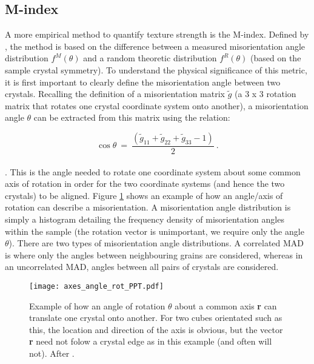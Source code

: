 \documentclass[a4paper,12pt]{report}
\numberwithin{equation}{chapter}
\begin{document}
\subsection{M-index} \label{subsec:Mindex}
A more empirical method to quantify texture strength is the M-index. Defined by \cite{Skemer}, the method is based on the difference between a measured misorientation angle distribution $f^M(\theta)$ and a random theoretic distribution $f^R(\theta)$ (based on the sample crystal symmetry). To understand the physical significance of this metric, it is first important to clearly define the misorientation angle between two crystals. Recalling the definition of a misorientation matrix $\tilde{g}$ (a 3 x 3 rotation matrix that rotates one crystal coordinate system onto another), a misorientation angle $\theta$ can be extracted from this matrix using the relation:

\begin{equation}
\cos{\theta}\ =\ \frac{(\tilde{g}_{11} + \tilde{g}_{22} + \tilde{g}_{33} - 1)}{2}\ .
\end{equation} 
\\
\citep{Randle2000}. This is the angle needed to rotate one coordinate system about some common axis of rotation in order for the two coordinate systems (and hence the two crystals) to be aligned. Figure \ref{fig:angle-axis_example} shows an example of how an angle/axis of rotation can describe a misorientation. A misorientation angle distribution is simply a histogram detailing the frequency density of misorientation angles within the sample (the rotation vector is unimportant, we require only the angle $\theta$). There are two types of misorientation angle distributions. A correlated MAD is where only the angles between neighbouring grains are considered, whereas in an uncorrelated MAD, angles between all pairs of crystals are considered.

\begin{figure}[h]
  \centering
    \texttt{[image: axes\_angle\_rot\_PPT.pdf]}
  \caption[Angle/axis of rotation example]{Example of how an angle of rotation $\theta$ about a common axis \textbf{r} can translate one crystal onto another. For two cubes orientated such as this, the location and direction of the axis is obvious, but the vector \textbf{r} need not folow a crystal edge as in this example (and often will not). After \cite{Randle2000}.}
  \label{fig:angle-axis_example}
\end{figure}
\end{document}
